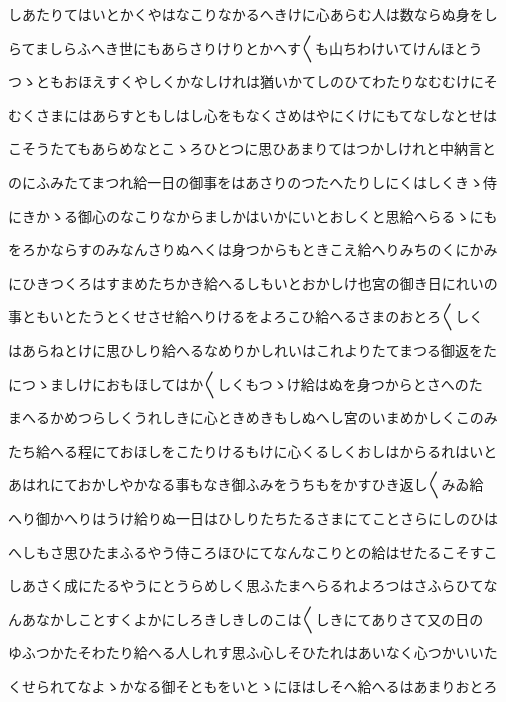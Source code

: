 \documentclass[a4paper,11pt,landscape]{ltjtarticle}
\begin{document}
\par\medskip
しあたりてはいとかくやはなこりなかるへきけに心あらむ人は数ならぬ身をし
\par\medskip
らてましらふへき世にもあらさりけりとかへす〱も山ちわけいてけんほとう
\par\medskip
つゝともおほえすくやしくかなしけれは猶いかてしのひてわたりなむむけにそ
\par\medskip
むくさまにはあらすともしはし心をもなくさめはやにくけにもてなしなとせは
\par\medskip
こそうたてもあらめなとこゝろひとつに思ひあまりてはつかしけれと中納言と
\par\medskip
のにふみたてまつれ給一日の御事をはあさりのつたへたりしにくはしくきゝ侍
\par\medskip
にきかゝる御心のなこりなからましかはいかにいとおしくと思給へらるゝにも
\par\medskip
をろかならすのみなんさりぬへくは身つからもときこえ給へりみちのくにかみ
\par\medskip
にひきつくろはすまめたちかき給へるしもいとおかしけ也宮の御き日にれいの
\par\medskip
事ともいとたうとくせさせ給へりけるをよろこひ給へるさまのおとろ〱しく
\par\medskip
はあらねとけに思ひしり給へるなめりかしれいはこれよりたてまつる御返をた
\par\medskip
につゝましけにおもほしてはか〱しくもつゝけ給はぬを身つからとさへのた
\par\medskip
まへるかめつらしくうれしきに心ときめきもしぬへし宮のいまめかしくこのみ
\par\medskip
たち給へる程にておほしをこたりけるもけに心くるしくおしはからるれはいと
\par\medskip
あはれにておかしやかなる事もなき御ふみをうちもをかすひき返し〱みゐ給
\par\medskip
へり御かへりはうけ給りぬ一日はひしりたちたるさまにてことさらにしのひは
\par\medskip
へしもさ思ひたまふるやう侍ころほひにてなんなこりとの給はせたるこそすこ
\par\medskip
しあさく成にたるやうにとうらめしく思ふたまへらるれよろつはさふらひてな
\par\medskip
んあなかしことすくよかにしろきしきしのこは〱しきにてありさて又の日の
\par\medskip
ゆふつかたそわたり給へる人しれす思ふ心しそひたれはあいなく心つかいいた
\par\medskip
くせられてなよゝかなる御そともをいとゝにほはしそへ給へるはあまりおとろ
\par\medskip
\end{document}
